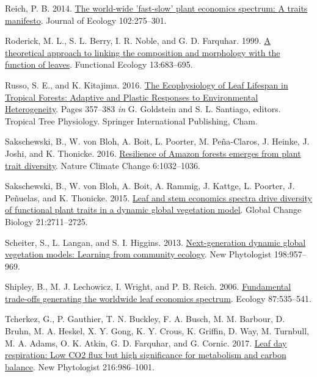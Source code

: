 \documentclass[
  12pt,
  a4paper,
,tablecaptionabove
]{scrartcl}
\newlength{\cslhangindent}
\newenvironment{CSLReferences}[2] %
 {%
  \setlength{\parindent}{0pt}
  \ifodd #1 \everypar{\setlength{\hangindent}{\cslhangindent}}\ignorespaces\fi
  \ifnum #2 > 0
  \setlength{\parskip}{#2\baselineskip}
  \fi
 }%
 {}
\begin{document}
\begin{CSLReferences}{1}{0}
\leavevmode{}%
Reich, P. B. 2014. \href{https://doi.org/10.1111/1365-2745.12211}{The world-wide 'fast-slow' plant economics spectrum: {A} traits manifesto}. Journal of Ecology 102:275--301.

\leavevmode{}%
Roderick, M. L., S. L. Berry, I. R. Noble, and G. D. Farquhar. 1999. \href{https://doi.org/10.1046/j.1365-2435.1999.00368.x}{A theoretical approach to linking the composition and morphology with the function of leaves}. Functional Ecology 13:683--695.

\leavevmode{}%
Russo, S. E., and K. Kitajima. 2016. \href{https://doi.org/10.1007/978-3-319-27422-5_17}{The {Ecophysiology} of {Leaf Lifespan} in {Tropical Forests}: {Adaptive} and {Plastic Responses} to {Environmental Heterogeneity}}. Pages 357--383 \emph{in} G. Goldstein and S. L. Santiago, editors. Tropical {Tree Physiology}. {Springer International Publishing}, {Cham}.

\leavevmode{}%
Sakschewski, B., W. von Bloh, A. Boit, L. Poorter, M. Peña-Claros, J. Heinke, J. Joshi, and K. Thonicke. 2016. \href{https://doi.org/10.1038/nclimate3109}{Resilience of {Amazon} forests emerges from plant trait diversity}. Nature Climate Change 6:1032--1036.

\leavevmode{}%
Sakschewski, B., W. von Bloh, A. Boit, A. Rammig, J. Kattge, L. Poorter, J. Peñuelas, and K. Thonicke. 2015. \href{https://doi.org/10.1111/gcb.12870}{Leaf and stem economics spectra drive diversity of functional plant traits in a dynamic global vegetation model}. Global Change Biology 21:2711--2725.

\leavevmode{}%
Scheiter, S., L. Langan, and S. I. Higgins. 2013. \href{https://doi.org/10.1111/nph.12210}{Next-generation dynamic global vegetation models: {Learning} from community ecology}. New Phytologist 198:957--969.

\leavevmode{}%
Shipley, B., M. J. Lechowicz, I. Wright, and P. B. Reich. 2006. \href{https://doi.org/10.1890/05-1051}{Fundamental trade-offs generating the worldwide leaf economics spectrum}. Ecology 87:535--541.

\leavevmode{}%
Tcherkez, G., P. Gauthier, T. N. Buckley, F. A. Busch, M. M. Barbour, D. Bruhn, M. A. Heskel, X. Y. Gong, K. Y. Crous, K. Griffin, D. Way, M. Turnbull, M. A. Adams, O. K. Atkin, G. D. Farquhar, and G. Cornic. 2017. \href{https://doi.org/10.1111/nph.14816}{Leaf day respiration: Low {CO2} flux but high significance for metabolism and carbon balance}. New Phytologist 216:986--1001.


\end{CSLReferences}
\end{document}
